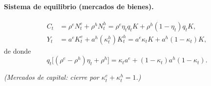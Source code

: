 \documentclass[11pt]{article}
\theoremstyle{definition}
\theoremstyle{remark}
\newcommand{\aE}{a^{e}}
\newcommand{\aH}{a^{h}}
\newcommand{\re}{\rho^{e}}
\newcommand{\rh}{\rho^{h}}
\begin{document}
\paragraph{Sistema de equilibrio (mercados de bienes).}
\begin{align}
C_t&=\re N_t^{e}+\rh N_t^{h}=\re\eta_tq_tK+\rh(1-\eta_t)q_tK,\\
Y_t&=\aE K_t^{e}+\aH(\kappa_t^{h})K_t^{h}=\aE\kappa_tK+\aH(1-\kappa_t)K,
\end{align}
de donde
\begin{equation}
q_t\big[(\re-\rh)\eta_t+\rh\big]=\kappa_t\aE+(1-\kappa_t)\aH(1-\kappa_t).
\end{equation}

\medskip
\noindent\emph{(Mercados de capital: cierre por $\kappa_t^{e}+\kappa_t^{h}=1$.)}
\end{document}
